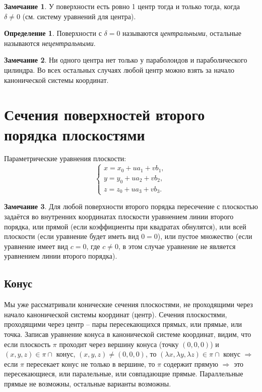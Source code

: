 \documentclass[a4paper, 12pt]{article}
\theoremstyle{definition}
\newtheorem*{definition}{Определение}
\newtheorem*{remark}{Замечание}
\begin{document}
\begin{remark}
    У поверхности есть ровно 1 центр тогда и только тогда, когда $\delta \neq 0$ (см. систему уравнений для центра).
\end{remark}

\begin{definition}
    Поверхности с $\delta = 0$ называются \textit{центральными}, остальные называются \textit{нецентральными}.
\end{definition}

\begin{remark}
    Ни одного центра нет только у параболоидов и параболического цилиндра. Во всех остальных случаях любой центр можно взять за начало канонической системы координат.
\end{remark}


\section{Сечения поверхностей второго порядка плоскостями}

Параметрические уравнения плоскости:
\[\begin{cases}
    x = x_0 + u a_1 + v b_1, \\
    y = y_0 + u a_2 + v b_2, \\
    z = z_0 + u a_3 + v b_3.
\end{cases}\]

\begin{remark}
    Для любой поверхности второго порядка пересечение с плоскостью задаётся во внутренних координатах плоскости уравнением линии второго порядка, или прямой (если коэффициенты при квадратах обнулятся), или всей плоскости (если уравнение будет иметь вид $0 = 0$), или пустое множество (если уравнение имеет вид $c = 0$, где $c \neq 0$, в этом случае уравнение не является уравнением линии второго порядка).
\end{remark}

\subsection{Конус}
Мы уже рассматривали конические сечения плоскостями, не проходящими через начало канонической системы координат (центр).
Сечения плоскостями, проходящими через центр – пары пересекающихся прямых, или прямые, или точка.
Записав уравнение конуса в канонической системе координат, видим, что если плоскость $\pi$ проходит через вершину конуса (точку $(0, 0, 0)$) и $(x,y,z) \in \pi \cap$ конус, $(x,y,z) \neq (0,0,0)$, то $(\lambda x, \lambda y, \lambda z) \in \pi \cap$ конус $\Rightarrow$ если $\pi$ пересекает конус не только в вершине, то $\pi$ содержит прямую $\Rightarrow$ это пересекающиеся, или паралельные, или совпадающие прямые.
Параллельные прямые не возможны, остальные варианты возможны.
\end{document}

